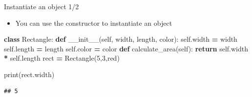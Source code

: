 \documentclass[
  8pt,
  ignorenonframetext,
]{beamer}
\newenvironment{Shaded}{\begin{snugshade}}{\end{snugshade}}
\newcommand{\BuiltInTok}[1]{#1}
\newcommand{\ControlFlowTok}[1]{\textcolor[rgb]{0.13,0.29,0.53}{\textbf{#1}}}
\newcommand{\DecValTok}[1]{\textcolor[rgb]{0.00,0.00,0.81}{#1}}
\newcommand{\FunctionTok}[1]{\textcolor[rgb]{0.00,0.00,0.00}{#1}}
\newcommand{\KeywordTok}[1]{\textcolor[rgb]{0.13,0.29,0.53}{\textbf{#1}}}
\newcommand{\NormalTok}[1]{#1}
\newcommand{\OperatorTok}[1]{\textcolor[rgb]{0.81,0.36,0.00}{\textbf{#1}}}
\newcommand{\StringTok}[1]{\textcolor[rgb]{0.31,0.60,0.02}{#1}}
\newcommand{\VariableTok}[1]{\textcolor[rgb]{0.00,0.00,0.00}{#1}}
\providecommand{\tightlist}{%
  \setlength{\itemsep}{0pt}\setlength{\parskip}{0pt}}
\begin{document}
\begin{frame}[fragile]{Instantiate an object 1/2}
\protect\hypertarget{instantiate-an-object-12}{}
\begin{itemize}
\tightlist
\item
  You can use the constructor to instantiate an object
\end{itemize}

\begin{Shaded}
\begin{Highlighting}[]
\KeywordTok{class}\NormalTok{ Rectangle:}
    \KeywordTok{def} \FunctionTok{\_\_init\_\_}\NormalTok{(}\VariableTok{self}\NormalTok{, width, length, color):}
        \VariableTok{self}\NormalTok{.width }\OperatorTok{=}\NormalTok{ width}
        \VariableTok{self}\NormalTok{.length }\OperatorTok{=}\NormalTok{ length}
        \VariableTok{self}\NormalTok{.color }\OperatorTok{=}\NormalTok{ color}
    \KeywordTok{def}\NormalTok{ calculate\_area(}\VariableTok{self}\NormalTok{):}
      \ControlFlowTok{return} \VariableTok{self}\NormalTok{.width }\OperatorTok{*} \VariableTok{self}\NormalTok{.length}
\NormalTok{rect }\OperatorTok{=}\NormalTok{ Rectangle(}\DecValTok{5}\NormalTok{,}\DecValTok{3}\NormalTok{,}\StringTok{\textquotesingle{}red\textquotesingle{}}\NormalTok{)}

\BuiltInTok{print}\NormalTok{(rect.width)}
\end{Highlighting}
\end{Shaded}

\begin{verbatim}
## 5
\end{verbatim}
\end{frame}
\end{document}
